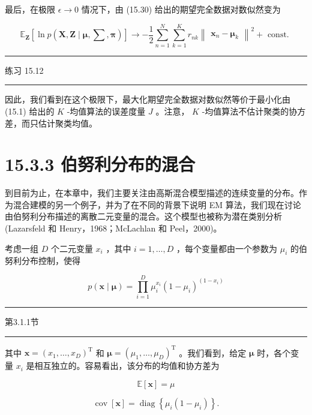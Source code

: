 \documentclass[10pt]{article}
\newcommand{\HRule}{\begin{center}\rule{0.9\linewidth}{0.2mm}\end{center}}
\begin{document}
最后，在极限 \(\epsilon  \rightarrow  0\) 情况下，由 (15.30) 给出的期望完全数据对数似然变为

\[
{\mathbb{E}}_{\mathbf{Z}}\left\lbrack  {\ln p\left( {\mathbf{X},\mathbf{Z} \mid  \mathbf{\mu },\mathbf{\sum },\mathbf{\pi }}\right) }\right\rbrack   \rightarrow   - \frac{1}{2}\mathop{\sum }\limits_{{n = 1}}^{N}\mathop{\sum }\limits_{{k = 1}}^{K}{r}_{nk}{\begin{Vmatrix}{\mathbf{x}}_{n} - {\mathbf{\mu }}_{k}\end{Vmatrix}}^{2} + \text{ const. } \tag{15.33}
\]

\HRule

练习 15.12

\HRule

因此，我们看到在这个极限下，最大化期望完全数据对数似然等价于最小化由 (15.1) 给出的 \(K\) -均值算法的误差度量 \(J\) 。注意， \(K\) -均值算法不估计聚类的协方差，而只估计聚类均值。

\section*{15.3.3 伯努利分布的混合}

到目前为止，在本章中，我们主要关注由高斯混合模型描述的连续变量的分布。作为混合建模的另一个例子，并为了在不同的背景下说明 EM 算法，我们现在讨论由伯努利分布描述的离散二元变量的混合。这个模型也被称为潜在类别分析(Lazarsfeld 和 Henry，1968；McLachlan 和 Peel，2000)。

考虑一组 \(D\) 个二元变量 \({x}_{i}\) ，其中 \(i = 1,\ldots ,D\) ，每个变量都由一个参数为 \({\mu }_{i}\) 的伯努利分布控制，使得

\[
p\left( {\mathbf{x} \mid  \mathbf{\mu }}\right)  = \mathop{\prod }\limits_{{i = 1}}^{D}{\mu }_{i}^{{x}_{i}}{\left( 1 - {\mu }_{i}\right) }^{\left( 1 - {x}_{i}\right) } \tag{15.34}
\]

\HRule

第3.1.1节

\HRule

其中 \(\mathbf{x} = {\left( {x}_{1},\ldots ,{x}_{D}\right) }^{\mathrm{T}}\) 和 \(\mathbf{\mu } = {\left( {\mu }_{1},\ldots ,{\mu }_{D}\right) }^{\mathrm{T}}\) 。我们看到，给定 \(\mathbf{\mu }\) 时，各个变量 \({x}_{i}\) 是相互独立的。容易看出，该分布的均值和协方差为

\[
\mathbb{E}\left\lbrack  \mathbf{x}\right\rbrack   = \mu  \tag{15.35}
\]

\[
\operatorname{cov}\left\lbrack  \mathbf{x}\right\rbrack   = \operatorname{diag}\left\{  {{\mu }_{i}\left( {1 - {\mu }_{i}}\right) }\right\}  . \tag{15.36}
\]
\end{document}
